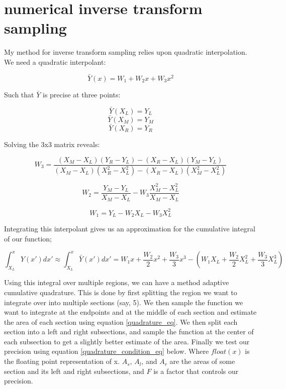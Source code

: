\documentclass[]{article}
\begin{document}
\section{numerical inverse transform sampling}

My method for inverse transform sampling relies upon quadratic interpolation. We need a quadratic interpolant:

\begin{equation}
\label{second_order_interpolant_eq}
\bar{Y}(x)=W_1 +W_2 x + W_3 x^2
\end{equation}

Such that $\bar{Y}$ is precise at three points:

\[ \bar{Y}(X_L)=Y_L \]
\[ \bar{Y}(X_M)=Y_M \]
\[ \bar{Y}(X_R)=Y_R \]

Solving the 3x3 matrix reveals:

\begin{equation}
W_3=\frac{(X_M-X_L)(Y_R-Y_L) - (X_R-X_L)(Y_M-Y_L)  }{ (X_M-X_L)(X_R^2-X_L^2) - (X_R-X_L)(X_M^2-X_L^2)   }
\end{equation}

\begin{equation}
W_2=\frac{  Y_M - Y_L  }{ X_M-X_L  } - W_3 \frac{X_M^2-X_L^2}{X_M-X_L}
\end{equation}

\begin{equation}
W_1=Y_L - W_2X_L - W_3X_L^2
\end{equation}

Integrating this interpolant gives us an approximation for the cumulative integral of our function;

\begin{equation}
\label{quadrature_eq}
\int_{X_L}^{x} Y(x') dx' \approx \int_{X_L}^{x} \bar{Y}(x') dx' = W_1x + \frac{W_2}{2}x^2 + \frac{W_3}{3}x^3 -(W_1X_L + \frac{W_2}{2}X_L^2 + \frac{W_3}{3}X_L^3)
\end{equation}

Using this integral over multiple regions, we can have a method adaptive cumulative quadrature. This is done by first splitting the region we want to integrate over into multiple sections (say, 5). We then sample the function we want to integrate at the endpoints and at the middle of each section and estimate the area of each section using equation \ref{quadrature_eq}. We then split each section into a left and right subsections, and sample the function at the center of each subsection to get a slightly better estimate of the area.  Finally we test our precision using equation \ref{quadrature_condition_eq} below. Where $float(x)$ is the floating point representation of x. $A_s$, $A_l$, and $A_r$ are the areas of some section and its left and right subsections, and $F$ is a factor that controls our precision. 
\end{document}
